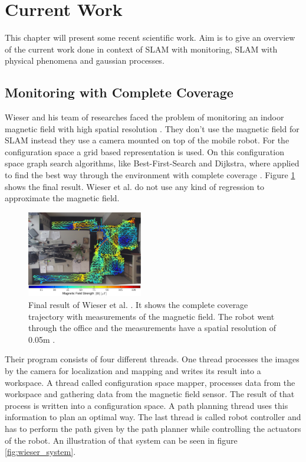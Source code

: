 \section{Current Work}
This chapter will present some recent scientific work. Aim is to give an overview
of the current work done in context of SLAM with monitoring, SLAM with physical phenomena and 
gaussian processes. 

\subsection{Monitoring with Complete Coverage}
\label{chap:complete_coverage}
Wieser and his team of researches faced the problem of monitoring an indoor magnetic field with high
spatial resolution \cite{wieser_slam_indoor_2014}. They don't use the magnetic field for
SLAM instead they use a camera mounted on top of the mobile robot. For the configuration space
a grid based representation is used. On this configuration space graph search algorithms, like 
Best-First-Search and Dijkstra, where applied to find the best way through the environment with
complete coverage \cite{wieser_slam_indoor_2014}. Figure \ref{fig:wieser_result} shows
the final result. Wieser et al. do not use any kind of regression to approximate the magnetic field.

\begin{figure}[h!]
	\centering
	\includegraphics[width=0.45\textwidth]{images/wieser_result.png}
	\caption{
            Final result of Wieser et al. \cite{wieser_slam_indoor_2014}. It shows
            the complete coverage trajectory with measurements of the magnetic 
            field. The robot went through the office and the
            measurements have a spatial resolution of 0.05m \cite{wieser_slam_indoor_2014}.
        }
	\label{fig:wieser_result}
\end{figure}

Their program consists of four different threads. One thread processes the images by the camera
for localization and mapping and writes its result into a workspace. A thread called configuration
space mapper, processes data from the workspace and gathering data from the magnetic field sensor.
The result of that process is written into a configuration space. A path planning thread uses this
information to plan an optimal way. The last thread is called robot controller and has to perform 
the path given by the path planner while controlling the actuators of the robot. An illustration of 
that system can be seen in figure \ref{fig:wieser_system}.

